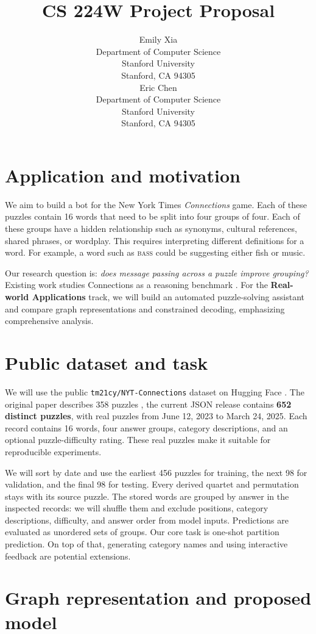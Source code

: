 \documentclass{article}
\title{CS 224W Project Proposal}
\author{%
  Emily Xia \\
  Department of Computer Science\\
  Stanford University\\
  Stanford, CA 94305 \\
  \And
  Eric Chen \\
  Department of Computer Science\\
  Stanford University\\
  Stanford, CA 94305 \\
}
\begin{document}
\maketitle


\section{Application and motivation}
We aim to build a bot for the New York Times \emph{Connections} game. Each of these puzzles contain 16 words that need to be split into four groups of four. Each of these groups have a hidden relationship such as synonyms, cultural references, shared phrases, or wordplay. This requires interpreting different definitions for a word. For example, a word such as \textsc{bass} could be suggesting either fish or music.

Our research question is: \emph{does message passing across a puzzle improve grouping?} Existing work studies Connections as a reasoning benchmark \citep{connections}. For the \textbf{Real-world Applications} track, we will build an automated puzzle-solving assistant and compare graph representations and constrained decoding, emphasizing comprehensive analysis.

\section{Public dataset and task}
We will use the public \texttt{tm21cy/NYT-Connections} dataset on Hugging Face \citep{dataset}. The original paper describes 358 puzzles \citep{connections}, the current JSON release contains \textbf{652 distinct puzzles}, with real puzzles from June 12, 2023 to March 24, 2025. Each record contains 16 words, four answer groups, category descriptions, and an optional puzzle-difficulty rating. These real puzzles make it suitable for reproducible experiments.

We will sort by date and use the earliest 456 puzzles for training, the next 98 for validation, and the final 98 for testing. Every derived quartet and permutation stays with its source puzzle. The stored words are grouped by answer in the inspected records: we will shuffle them and exclude positions, category descriptions, difficulty, and answer order from model inputs. Predictions are evaluated as unordered sets of groups. Our core task is one-shot partition prediction. On top of that, generating category names and using interactive feedback are potential extensions.

\section{Graph representation and proposed model}
\end{document}
